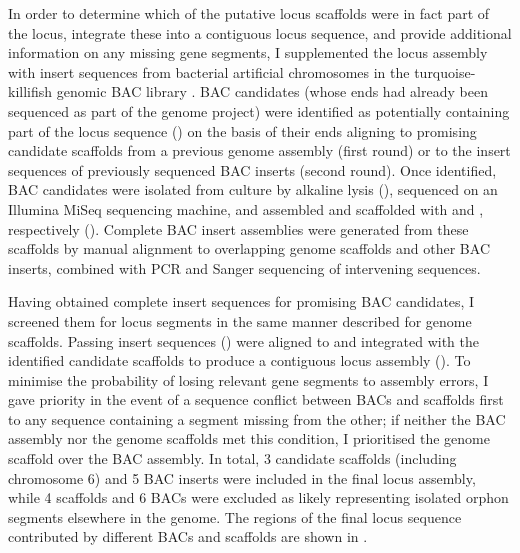 In order to determine which of the putative locus scaffolds were in fact part of the \igh{} locus, integrate these into a contiguous locus sequence, and provide additional information on any missing gene segments, I supplemented the locus assembly with insert sequences from bacterial artificial chromosomes in the turquoise-killifish genomic BAC library \parencite{reichwald2015genome}. BAC candidates (whose ends had already been sequenced as part of the genome project) were identified as potentially containing part of the locus sequence () on the basis of their ends aligning to promising candidate scaffolds from a previous genome assembly (first round) or to the insert sequences of previously sequenced BAC inserts (second round). Once identified,  BAC candidates were isolated from culture by alkaline lysis (), sequenced on an Illumina MiSeq sequencing machine, and assembled and scaffolded with  and , respectively (). Complete BAC insert assemblies were generated from these scaffolds by manual alignment to overlapping genome scaffolds and other BAC inserts, combined with PCR and Sanger sequencing of intervening sequences.

Having obtained complete insert sequences for promising BAC candidates, I screened them for \igh{} locus segments in the same manner described for genome scaffolds. Passing insert sequences () were aligned to and integrated with the identified candidate scaffolds to produce a contiguous locus assembly (). To minimise the probability of losing relevant gene segments to assembly errors, I gave priority in the event of a sequence conflict between BACs and scaffolds first to any sequence containing a segment missing from the other; if neither the BAC assembly nor the genome scaffolds met this condition, I prioritised the genome scaffold over the BAC assembly. In total, 3 candidate scaffolds (including chromosome 6) and 5 BAC inserts were included in the final locus assembly, while 4 scaffolds and 6 BACs were excluded as likely representing isolated \igh{} orphon segments elsewhere in the genome. The regions of the final locus sequence contributed by different BACs and scaffolds are shown in .

